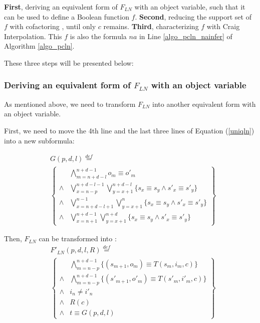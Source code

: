 \documentclass[journal]{IEEEtran}
\begin{document}
\textbf{First},
deriving an equivalent form of $F_{LN}$ with an object variable,
       such that it can be used to define a Boolean function $f$.
\textbf{Second},
reducing the support set of $f$ with cofactoring \cite{Cofact},
       until only $c$ remains.
\textbf{Third}, characterizing $f$ with Craig Interpolation.
       This $f$ is also the formula $na$ in Line \ref{algo_pcln_nainfer} of Algorithm \ref{algo_pcln}.

These three steps will be presented below:

\subsubsection{\textbf{Deriving an equivalent form of $F_{LN}$ with an object variable}}

As mentioned above,
we need to transform $F_{LN}$ into another equivalent form with an object variable.

First,
we need to move the 4th line and the last three lines of Equation (\ref{uniqln}) into a new subformula:

\begin{equation}\label{uniqln_subg}
\begin{split}
&G(p,d,l)\stackrel{def}{=}\\
&\left\{
\begin{array}{cc}
&\bigwedge_{m=n+d-l}^{n+d-1}o_m\equiv o'_m \\
\wedge& \bigvee_{x=n-p}^{n+d-l-1}\bigvee_{y=x+1}^{n+d-l} \{s_x\equiv s_y\wedge s'_x\equiv s'_y\} \\
\wedge& \bigvee_{x=n+d-l+1}^{n-1}\bigvee_{y=x+1}^{n} \{s_x\equiv s_y\wedge s'_x\equiv s'_y\} \\
\wedge& \bigvee_{x=n+1}^{n+d-1}\bigvee_{y=x+1}^{n+d} \{s_x\equiv s_y\wedge s'_x\equiv s'_y\}
\end{array}
\right\}
\end{split}
\end{equation}

Then,
$F_{LN}$ can be transformed into :
\begin{equation}\label{uniqln_new}
\begin{split}
&F'_{LN}(p,d,l,R)\stackrel{def}{=}\\
&\left\{
\begin{array}{cc}
&\bigwedge_{m=n-p}^{n+d-1}
\{
(s_{m+1},o_m)\equiv T(s_m,i_m,c)
\}
\\
\wedge&\bigwedge_{m=n-p}^{n+d-1}
\{
(s'_{m+1},o'_m)\equiv T(s'_m,i'_m,c)
\}
\\
\wedge& i_n\ne i'_n \\
\wedge& R(c) \\
\wedge& t\equiv G(p,d,l)
\end{array}
\right\}
\end{split}
\end{equation}
\end{document}
